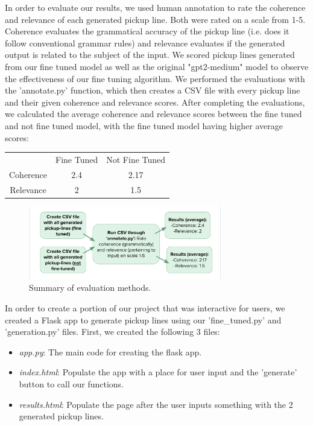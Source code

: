 \documentclass[12pt,reqno]{amsart}
\theoremstyle{plain}
\theoremstyle{definition}
\theoremstyle{remark}
\begin{document}
In order to evaluate our results, we used human annotation to rate the coherence and relevance of each generated pickup line. Both were rated on a scale from 1-5. Coherence evaluates the grammatical accuracy of the pickup line (i.e. does it follow conventional grammar rules) and relevance evaluates if the generated output is related to the subject of the input. We scored pickup lines generated from our fine tuned model as well as the original "gpt2-medium" model to observe the effectiveness of our fine tuning algorithm. We performed the evaluations with the 'annotate.py' function, which then creates a CSV file with every pickup line and their given coherence and relevance scores. After completing the evaluations, we calculated the average coherence and relevance scores between the fine tuned and not fine tuned model, with the fine tuned model having higher average scores:
\vspace{3mm}

\begin{center}
\begin{tabular}{ c c | c }
  & Fine Tuned & Not Fine Tuned \\ 
 Coherence & 2.4 & 2.17 \\  
 \hline
 Relevance & 2 & 1.5    
\end{tabular}
\end{center}

\begin{figure}[H]
\centering
\includegraphics[width=0.75\textwidth]{pictures/evaluate.png}
\caption{Summary of evaluation methods.}
\end{figure}

In order to create a portion of our project that was interactive for users, we created a Flask app to generate pickup lines using our 'fine\_tuned.py' and 'generation.py' files. First, we created the following 3 files:
\begin{itemize}
    \item \textit{app.py}: The main code for creating the flask app.
    \item \textit{index.html}: Populate the app with a place for user input and the 'generate' button to call our functions.
    \item \textit{results.html}: Populate the page after the user inputs something with the 2 generated pickup lines.
\end{itemize}
\end{document}
